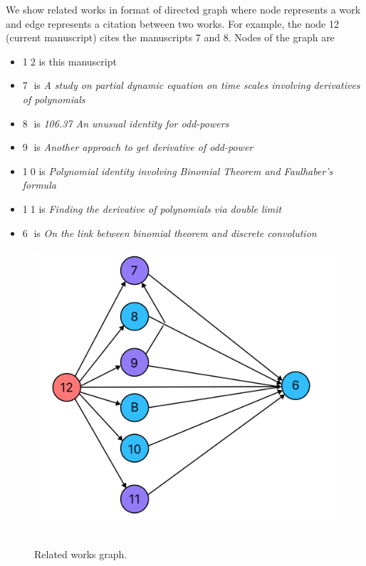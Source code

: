 We show related works in format of directed graph where node represents a work and edge represents a citation
between two works.
For example, the node 12 (current manuscript) cites the manuscripts 7 and 8.
Nodes of the graph are
\begin{itemize}
    \item {\Large \textcircled{\normalsize 12}} is this manuscript
    \item {\Large \textcircled{\normalsize 7}} is \textit{A study on partial dynamic equation on time scales involving derivatives
    of polynomials}~\cite{kolosov2016study}
    \item {\Large \textcircled{\normalsize 8}} is \textit{106.37 An unusual identity for odd-powers}~\cite{kolosov2022106}
    \item {\Large \textcircled{\normalsize 9}} is \textit{Another approach to get derivative of odd-power}~\cite{kolosov2023another}
    \item {\Large \textcircled{\normalsize 10}} is \textit{Polynomial identity involving Binomial Theorem and Faulhaber's formula}~\cite{kolosov2023polynomial}
    \item {\Large \textcircled{\normalsize 11}} is \textit{Finding the derivative of polynomials via double limit}~\cite{kolosov_2024_10575485}
    \item {\Large \textcircled{\normalsize 6}} is \textit{On the link between binomial theorem and discrete convolution}~\cite{kolosov2016link}
\end{itemize}
\begin{figure}[H]
    \centering
    \includegraphics[width=1\textwidth]{images/realated_works_graph}
    ~\caption{Related works graph.}\label{fig:related-works-graph}
\end{figure}
